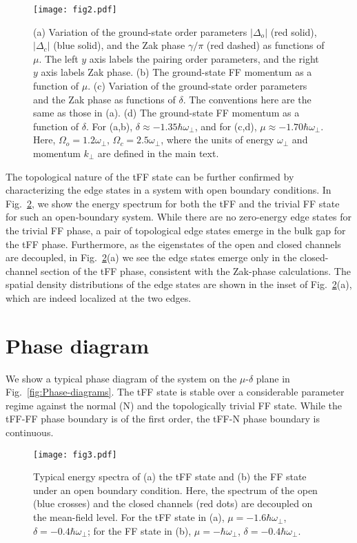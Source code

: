 \documentclass[a4paper, aps,pra, twocolumn, superscriptaddress, showpacs]{revtex4}
\begin{document}
\begin{figure}
\texttt{[image: fig2.pdf]}
\caption{(a) Variation of the ground-state order parameters $|\Delta_o|$ (red solid), $|\Delta_c|$ (blue solid), and the Zak phase $\gamma/\pi$ (red dashed) as functions of $\mu$. The left $y$ axis labels the pairing order parameters, and the right $y$ axis labels Zak phase. (b) The ground-state FF momentum as a function of $\mu$. (c) Variation of the ground-state order parameters and the Zak phase as functions of $\delta$. The conventions here are the same as those in (a). (d) The ground-state FF momentum as a function of $\delta$. For (a,b), $\delta\approx -1.35\hbar\omega_{\perp}$, and for (c,d), $\mu\approx -1.70\hbar\omega_{\perp}$. Here, $\Omega_{o}=1.2\omega_{\perp}$, $\Omega_{c}=2.5\omega_{\perp}$, where the units of energy $\omega_{\perp}$ and momentum $k_{\perp}$ are defined in the main text.}\label{fig:Order-parameters}
\end{figure}

The topological nature of the tFF state can be further confirmed by characterizing the edge states in a system with open boundary conditions. In Fig.~\ref{fig:Edge-state}, we show the energy spectrum for both the tFF and the trivial FF state for such an open-boundary system. While there are
no zero-energy edge states for the trivial FF phase, a pair of topological edge states emerge in the bulk gap for the tFF phase. Furthermore, as the eigenstates of the open and closed channels are decoupled, in Fig.~\ref{fig:Edge-state}(a) we see the edge states emerge only in the closed-channel section of the tFF phase, consistent with the Zak-phase calculations. The spatial density distributions of the edge states are shown in the inset of Fig.~\ref{fig:Edge-state}(a), which are indeed localized at the two edges.


\section{Phase diagram}
\label{sec:diagram}
We show a typical phase diagram of the system on the $\mu$-$\delta$ plane in Fig.~\ref{fig:Phase-diagrams}. The tFF state is stable over a considerable parameter regime against the normal (N) and the topologically trivial FF state. While the tFF-FF phase boundary is of the first order, the tFF-N phase boundary is continuous.

\begin{figure}
\texttt{[image: fig3.pdf]}
\caption{\label{fig:Edge-state} Typical energy spectra of (a) the tFF state and (b) the FF state under an open boundary condition. Here, the spectrum of the open (blue crosses) and the closed channels (red dots) are decoupled on the mean-field level. For the tFF state in (a), $\mu=-1.6\hbar\omega_{\perp}$, $\delta=-0.4\hbar\omega_{\perp}$; for the FF state in (b), $\mu=-\hbar\omega_{\perp}$, $\delta=-0.4\hbar\omega_{\perp}$. }
\end{figure}
\end{document}
